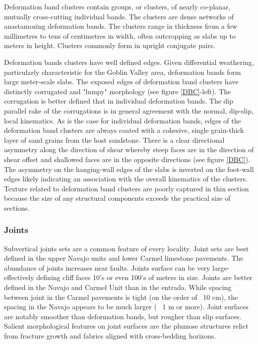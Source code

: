 \documentclass[12pt,a4paper]{article}
\begin{document}
Deformation band clusters contain groups, or clusters, of nearly co-planar, mutually cross-cutting individual bands. The clusters are dense networks of anastamozing deformation bands. The clusters range in thickness from a few millimetres to tens of centimetres in width, often outcropping as slabs up to meters in height.  Clusters commonly form in upright conjugate pairs.

Deformation bands clusters have well defined edges. Given differential weathering, particularly characteristic for the Goblin Valley area, deformation bands form large meter-scale slabs. The exposed edges of deformation band clusters have distinctly corrugated and "lumpy" morphology (see figure \ref{DBC}-left). The corrugation is better defined that in individual deformation bands. The dip parallel rake of the corrugations is in general agreement with the normal, dip-slip, local kinematics. As is the case for individual deformation bands, edges of the deformation band clusters are always coated with a cohesive, single grain-thick layer of sand grains from the host sandstone. There is a clear directional asymmetry along the direction of shear whereby steep faces are in the direction of shear offset and shallowed faces are in the opposite directions (see figure \ref{DBC}). The asymmetry on the hanging-wall edges of the slabs is inverted on the foot-wall edges likely indicating an association with the overall kinematics of the clusters. Texture related to deformation band clusters are poorly captured in thin section because the size of any structural components exceeds the practical size of sections.


\subsubsection{Joints}

Subvertical joints sets are a common feature of every locality. Joint sets are best defined in the upper Navajo units and lower Carmel limestone pavements. The abundance of joints increases near faults. Joints surface can be very large- effectively defining cliff faces 10's or even 100's of meters in size. Joints are better defined in the Navajo and Carmel Unit than in the entrada. While spacing between joint in the Carmel pavements is tight (on the order of ~10 cm), the spacing in the Navajo appears to be much larger (~ 1 m or more). Joint surfaces are notably smoother than deformation bands, but rougher than slip surfaces. Salient morphological features on joint surfaces are the plumose structures relict from fracture growth and fabrics  aligned with cross-bedding horizons.
\end{document}
